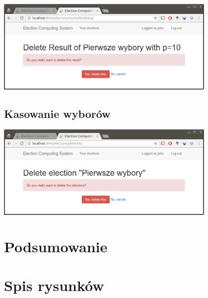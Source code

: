 \documentclass[pdflatex,11pt]{../aghdoc}
\begin{document}
\includegraphics[width=0.8\textwidth]{pics/delete-result.png}


\section{Kasowanie wyborów}
\label{sec:kasowaniewyborow}

\includegraphics[width=0.8\textwidth]{pics/delete-elections.png}



\chapter{Podsumowanie}
\label{cha:podsumowanie}



\chapter{Spis rysunków}
\label{cha:rysunki}





\end{document}

